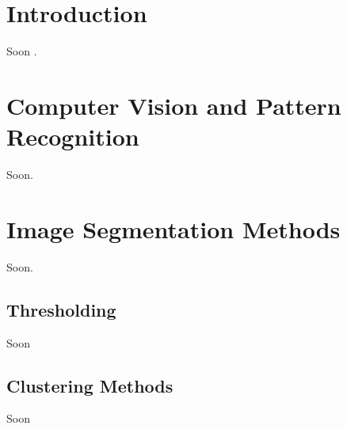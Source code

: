 
\section{Introduction}\label{sec:3.1}
\vspace{-0.5cm}
\noindent Soon \cite{Duttweiler}.

\vspace{-0.3cm}




\section{Computer Vision and Pattern Recognition}\label{sec:3.2}
\vspace{-0.5cm}
\noindent Soon.

\vspace{-0.3cm}




\section{Image Segmentation Methods}\label{sec:3.3}
\vspace{-0.5cm}
\noindent Soon.

\vspace{-0.3cm}

\subsection{Thresholding}\label{sec:3.3.1}
\vspace{-0.5cm}
\noindent  Soon

\vspace{-0.3cm}

\subsection{Clustering Methods}\label{sec:3.3.2}
\vspace{-0.5cm}
\noindent Soon

